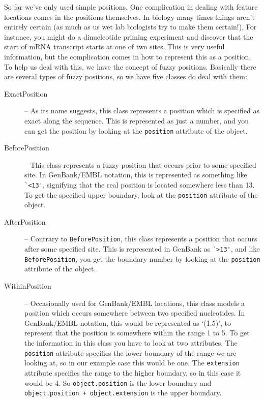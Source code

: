 So far we've only used simple positions. One complication in dealing
with feature locations comes in the positions themselves.
In biology many times things aren't entirely certain
(as much as us wet lab biologists try to make them certain!). For
instance, you might do a dinucleotide priming experiment and discover
that the start of mRNA transcript starts at one of two sites. This
is very useful information, but the complication comes in how to
represent this as a position. To help us deal with this, we have
the concept of fuzzy positions. Basically there are several types
of fuzzy positions, so we have five classes do deal with them:

\begin{description}
  \item[ExactPosition] -- As its name suggests, this class represents a position which is specified as exact along the sequence. This is represented as just a number, and you can get the position by looking at the \verb|position| attribute of the object.

  \item[BeforePosition] -- This class represents a fuzzy position
  that occurs prior to some specified site. In GenBank/EMBL notation,
  this is represented as something like \verb|`<13'|, signifying that
  the real position is located somewhere less than 13. To get
  the specified upper boundary, look at the \verb|position|
  attribute of the object.

  \item[AfterPosition] -- Contrary to \verb|BeforePosition|, this
  class represents a position that occurs after some specified site.
  This is represented in GenBank as \verb|`>13'|, and like
  \verb|BeforePosition|, you get the boundary number by looking
  at the \verb|position| attribute of the object.

  \item[WithinPosition] -- Occasionally used for GenBank/EMBL locations,
  this class models a position which occurs somewhere between two
  specified nucleotides. In GenBank/EMBL notation, this would be
  represented as `(1.5)', to represent that the position is somewhere
  within the range 1 to 5. To get the information in this class you
  have to look at two attributes. The \verb|position| attribute
  specifies the lower boundary of the range we are looking at, so in
  our example case this would be one. The \verb|extension| attribute
  specifies the range to the higher boundary, so in this case it
  would be 4. So \verb|object.position| is the lower boundary and
  \verb|object.position + object.extension| is the upper boundary.


\end{description}
